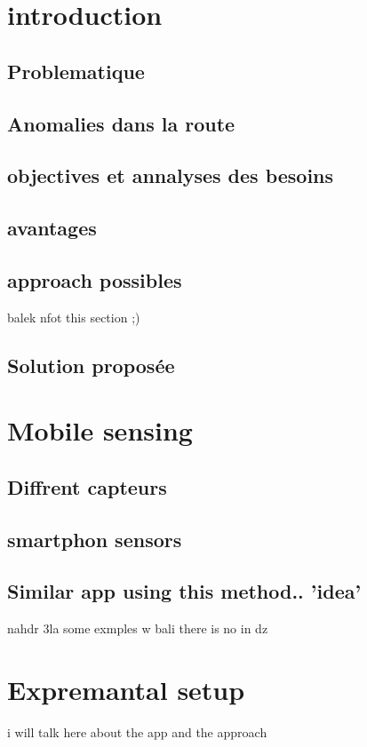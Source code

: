 \renewcommand\labelitemi{-}
\renewcommand\labelitemii{$\circ$}
\renewcommand {\thesection}{\arabic{section}}

\chapter{introduction}
\section{Problematique}
\section{Anomalies dans la route}
\section{objectives et annalyses des besoins}
\section{avantages}
\section{approach possibles} 
balek nfot this section ;) 
\section{Solution proposée}

\chapter{Mobile sensing}
\section{Diffrent capteurs}
\section{smartphon sensors}
\section{Similar app using this method.. 'idea'}
nahdr 3la some exmples w bali there is no in dz 

\chapter{Expremantal setup}
i will talk here about the app and the approach
